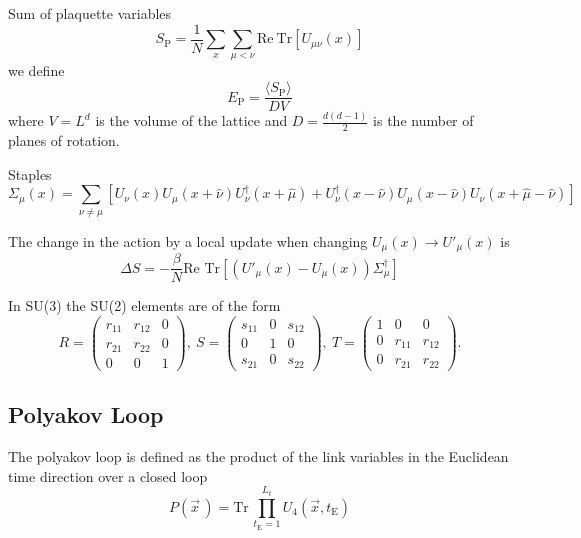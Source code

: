 \documentclass[12pt,a4paper]{article}
\begin{document}
Sum of plaquette variables
\begin{equation}
	\label{eq:Sp}
	S_{\text{P}} = \frac{1}{N} \sum_x\sum_{\mu < \nu} \text{Re}\ \text{Tr} [U_{\mu\nu}(x)]
\end{equation}
we define
\begin{equation}
	\label{eq:Ep}
	E_{\text{P}} =\frac{ \langle S_{\text{P}} \rangle}{D V}
\end{equation}
where $V=L^d$ is the volume of the lattice and $D = \frac{d(d-1)}{2}$ is the number of planes of rotation.

Staples
\begin{equation}
	\label{eq:staples}
	\Sigma_{\mu}(x) = \sum_{\nu \neq \mu} \left[ U_{\nu}(x)U_{\mu}(x+\hat{\nu})U_{\nu}^{\dagger}(x+\hat{\mu}) + U_{\nu}^{\dagger}(x-\hat{\nu})U_{\mu}(x-\hat{\nu})U_{\nu}(x+\hat{\mu}-\hat{\nu})\right]
\end{equation}


The change in the action  by a local update when changing $U_{\mu}(x) \to U'_{\mu}(x)$ is
\begin{equation}
	\label{eq:DS}
	\Delta S = -\frac{\beta}{N} \text{Re } \text{Tr} \left[ \left( U'_{\mu}(x) - U_{\mu}(x) \right)\Sigma_{\mu}^{\dagger}\right]
\end{equation}

In SU(3) the SU(2) elements are of the form
\begin{equation}
\label{eq:SU2_subgroups}
	R = \begin{pmatrix}
		r_{11} & r_{12} & 0 \\
		r_{21} & r_{22} & 0 \\
		0      & 0      & 1 
	\end{pmatrix},\ S = \begin{pmatrix}
		s_{11} & 0 & s_{12} \\
		0      & 1 & 0 \\
		s_{21} & 0 & s_{22} 
	\end{pmatrix},\ T = \begin{pmatrix}
		1 & 0 & 0 \\
		0 & r_{11} & r_{12} \\
		0 & r_{21} & r_{22}
	\end{pmatrix}.
\end{equation}


	\subsection{Polyakov Loop}
	The polyakov loop is defined as the product of the link variables in the Euclidean time direction over a closed loop
	\begin{equation}
		P(\vec{x}\,) = \text{Tr}\,\prod_{t_\text{E}=1}^{L_t}U_4(\vec{x},t_\text{E}) 
	\end{equation}
\end{document}
